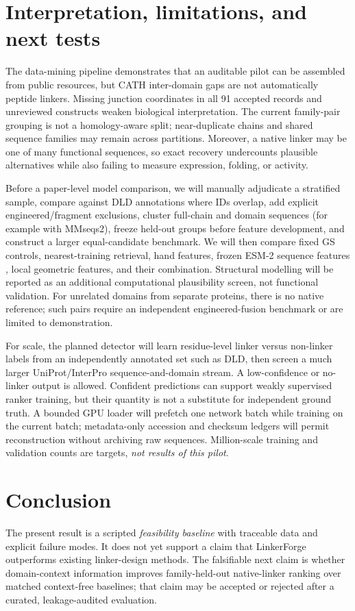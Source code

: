 \documentclass[10pt,a4paper]{article}
\begin{document}
\section{Interpretation, limitations, and next tests}
The data-mining pipeline demonstrates that an auditable pilot can be assembled from public resources, but CATH inter-domain gaps are not automatically peptide linkers. Missing junction coordinates in all 91 accepted records and unreviewed constructs weaken biological interpretation. The current family-pair grouping is not a homology-aware split; near-duplicate chains and shared sequence families may remain across partitions. Moreover, a native linker may be one of many functional sequences, so exact recovery undercounts plausible alternatives while also failing to measure expression, folding, or activity.

Before a paper-level model comparison, we will manually adjudicate a stratified sample, compare against DLD annotations where IDs overlap, add explicit engineered/fragment exclusions, cluster full-chain and domain sequences (for example with MMseqs2), freeze held-out groups before feature development, and construct a larger equal-candidate benchmark. We will then compare fixed GS controls, nearest-training retrieval, hand features, frozen ESM-2 sequence features \cite{esm}, local geometric features, and their combination. Structural modelling will be reported as an additional computational plausibility screen, not functional validation. For unrelated domains from separate proteins, there is no native reference; such pairs require an independent engineered-fusion benchmark or are limited to demonstration.

For scale, the planned detector will learn residue-level linker versus non-linker labels from an independently annotated set such as DLD, then screen a much larger UniProt/InterPro sequence-and-domain stream. A low-confidence or no-linker output is allowed. Confident predictions can support weakly supervised ranker training, but their quantity is not a substitute for independent ground truth. A bounded GPU loader will prefetch one network batch while training on the current batch; metadata-only accession and checksum ledgers will permit reconstruction without archiving raw sequences. Million-scale training and validation counts are targets, \emph{not results of this pilot}.

\section{Conclusion}
The present result is a scripted \emph{feasibility baseline} with traceable data and explicit failure modes. It does not yet support a claim that LinkerForge outperforms existing linker-design methods. The falsifiable next claim is whether domain-context information improves family-held-out native-linker ranking over matched context-free baselines; that claim may be accepted or rejected after a curated, leakage-audited evaluation.
\end{document}
